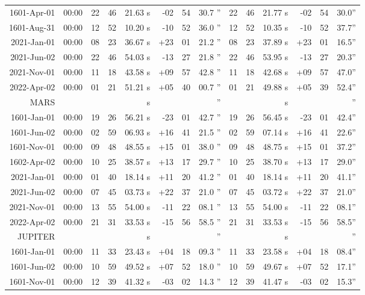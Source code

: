 \begin{longtable}{r@{\,}r|r@{h}r@{m}r<{s}|r@{°}r@{'}r<{''}||r@{h}r@{m}r<{s}|r@{°}r@{'}r<{''}}
 1601-Apr-01 & 00:00  &   22 & 46 & 21.63 & -02 & 54 & 30.7 & 22&46&21.77 & -02&54&30.0\\ %
 1601-Aug-31 & 00:00  &   12 & 52 & 10.20 & -10 & 52 & 36.0 & 12&52&10.35 & -10&52&37.7\\ %
 2021-Jan-01 & 00:00  &   08 & 23 & 36.67 & +23 & 01 & 21.2 & 08&23&37.89 & +23&01&16.5\\ %
 2021-Jun-02 & 00:00  &   22 & 46 & 54.03 & -13 & 27 & 21.8 & 22&46&53.95 & -13&27&20.3\\ %
 2021-Nov-01 & 00:00  &   11 & 18 & 43.58 & +09 & 57 & 42.8 & 11&18&42.68 & +09&57&47.0\\ %
 2022-Apr-02 & 00:00  &   01 & 21 & 51.21 & +05 & 40 & 00.7 & 01&21&49.88 & +05&39&52.4\\ %
MARS       \\
 1601-Jan-01 & 00:00  &   19 & 26 & 56.21 & -23 & 01 & 42.7 & 19&26&56.45 & -23&01&42.4\\ %
 1601-Jun-02 & 00:00  &   02 & 59 & 06.93 & +16 & 41 & 21.5 & 02&59&07.14 & +16&41&22.6\\ %
 1601-Nov-01 & 00:00  &   09 & 48 & 48.55 & +15 & 01 & 38.0 & 09&48&48.75 & +15&01&37.2\\ %
 1602-Apr-02 & 00:00  &   10 & 25 & 38.57 & +13 & 17 & 29.7 & 10&25&38.70 & +13&17&29.0\\ %
 2021-Jan-01 & 00:00  &   01 & 40 & 18.14 & +11 & 20 & 41.2 & 01&40&18.14 & +11&20&41.1\\ %
 2021-Jun-02 & 00:00  &   07 & 45 & 03.73 & +22 & 37 & 21.0 & 07&45&03.72 & +22&37&21.0\\ %
 2021-Nov-01 & 00:00  &   13 & 55 & 54.00 & -11 & 22 & 08.1 & 13&55&54.00 & -11&22&08.1\\ %
 2022-Apr-02 & 00:00  &   21 & 31 & 33.53 & -15 & 56 & 58.5 & 21&31&33.53 & -15&56&58.5\\ %
JUPITER          \\
 1601-Jan-01 & 00:00  &   11 & 33 & 23.43 & +04 & 18 & 09.3 & 11&33&23.58 & +04&18&08.4\\ %
 1601-Jun-02 & 00:00  &   10 & 59 & 49.52 & +07 & 52 & 18.0 & 10&59&49.67 & +07&52&17.1\\ %
 1601-Nov-01 & 00:00  &   12 & 39 & 41.32 & -03 & 02 & 14.3 & 12&39&41.47 & -03&02&15.3\\ %

\end{longtable}
